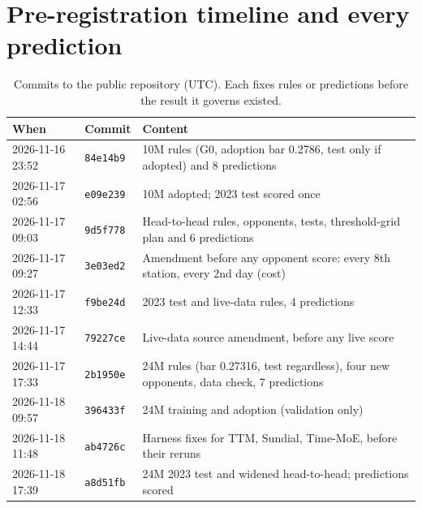 \documentclass{article}
\begin{document}
\section{Pre-registration timeline and every prediction}
\label{app:prereg}

\begin{table}[H]
\caption{Commits to the public repository (UTC). Each fixes rules or predictions before the result it governs existed.}
\label{tab:timeline}
\centering\scriptsize
\begin{tabular}{lll}
\toprule
When & Commit & Content\\
\midrule
2026-11-16 23:52 & \texttt{84e14b9} & 10M rules (G0, adoption bar 0.2786, test only if adopted) and 8 predictions\\
2026-11-17 02:56 & \texttt{e09e239} & 10M adopted; 2023 test scored once\\
2026-11-17 09:03 & \texttt{9d5f778} & Head-to-head rules, opponents, tests, threshold-grid plan and 6 predictions\\
2026-11-17 09:27 & \texttt{3e03ed2} & Amendment before any opponent score: every 8th station, every 2nd day (cost)\\
2026-11-17 12:33 & \texttt{f9be24d} & 2023 test and live-data rules, 4 predictions\\
2026-11-17 14:44 & \texttt{79227ce} & Live-data source amendment, before any live score\\
2026-11-17 17:33 & \texttt{2b1950e} & 24M rules (bar 0.27316, test regardless), four new opponents, data check, 7 predictions\\
2026-11-18 09:57 & \texttt{396433f} & 24M training and adoption (validation only)\\
2026-11-18 11:48 & \texttt{ab4726c} & Harness fixes for TTM, Sundial, Time-MoE, before their reruns\\
2026-11-18 17:39 & \texttt{a8d51fb} & 24M 2023 test and widened head-to-head; predictions scored\\
\bottomrule
\end{tabular}
\end{table}
\end{document}
